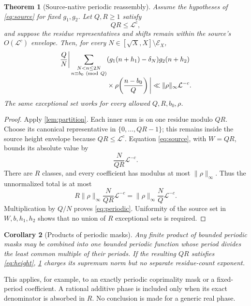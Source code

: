 \documentclass[11pt]{article}
\newtheorem{theorem}{Theorem}[section]
\newtheorem{corollary}[theorem]{Corollary}
\theoremstyle{definition}
\theoremstyle{remark}
\begin{document}
\begin{theorem}[Source-native periodic reassembly]
\label{thm:periodic}
Assume the hypotheses of \eqref{eq:source} for fixed \(g_1,g_2\).
Let \(Q,R\ge1\) satisfy
\begin{equation}
 QR\le\mathcal L^c,
\label{eq:height}
\end{equation}
and suppose the residue representatives and shifts remain within the
source's \(O(\mathcal L^c)\) envelope.  Then, for every
\(N\in[\sqrt X,X]\setminus\mathcal E_X\),
\begin{align}
 \frac QN\bigg|
 \sum_{\substack{N<n\le2N\\n\equiv b_0\ ({\rm mod}\ Q)}}
 &(g_1(n+h_1)-\delta_N)g_2(n+h_2)
\notag\\[-1mm]
 &\times\rho\!\left(\frac{n-b_0}{Q}\right)
 \bigg|
 \ll \|\rho\|_\infty\mathcal L^{-c}.
\label{eq:periodic}
\end{align}
The same exceptional set works for every allowed \(Q,R,b_0,\rho\).
\end{theorem}

\begin{proof}
Apply \cref{lem:partition}.  Each inner sum is on one residue modulo
\(QR\).  Choose its canonical representative in
\(\{0,\ldots,QR-1\}\); this remains inside the source height
envelope because \(QR\le\mathcal L^c\).  Equation
\eqref{eq:source}, with \(W=QR\), bounds its
absolute value by
\[
 \frac{N}{QR}\mathcal L^{-c}.
\]
There are \(R\) classes, and every coefficient has modulus at most
\(\|\rho\|_\infty\).  Thus the unnormalized total is at most
\[
 R\|\rho\|_\infty\frac{N}{QR}\mathcal L^{-c}
 =
 \|\rho\|_\infty\frac NQ\mathcal L^{-c}.
\]
Multiplication by \(Q/N\) proves \eqref{eq:periodic}.  Uniformity of
the source set in \(W,b,h_1,h_2\) shows that no union of \(R\)
exceptional sets is required.
\end{proof}

\begin{corollary}[Products of periodic masks]
\label{cor:masks}
Any finite product of bounded periodic masks may be combined into
one bounded periodic function whose period divides the least common
multiple of their periods.  If the resulting \(QR\) satisfies
\eqref{eq:height}, \cref{thm:periodic} charges its supremum norm but
no separate residue-count exponent.
\end{corollary}

This applies, for example, to an exactly periodic coprimality mask or
a fixed-period coefficient.  A rational additive phase is included
only when its exact denominator is absorbed in \(R\).  No conclusion
is made for a generic real phase.
\end{document}
